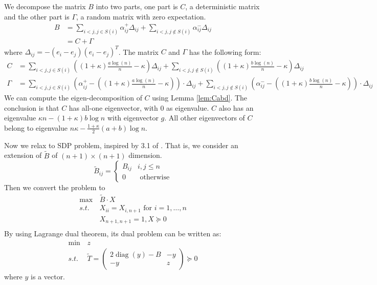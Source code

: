 \documentclass{article}
\DeclareMathOperator{\diag}{diag}
\newcommand{\A}{\frac{a \log(n)}{n}}
\newcommand{\B}{\frac{b \log(n)}{n}}
\begin{document}

We decompose the matrix $B$ into two parts, one part is $C$, a deterministic matrix and the other part is $\Gamma$, a random matrix
with zero expectation.
\begin{align}
B & = \sum_{i<j, j\in S(i)} \alpha_{ij}^+ \Delta_{ij} + \sum_{i<j, j\not\in S(i)}\alpha_{ij}^- \Delta_{ij} \\
& = C + \Gamma
\end{align}
where $\Delta_{ij} = -(e_i - e_j)(e_i - e_j)^T $.
The matrix $C$ and $\Gamma$ has the following form:
\begin{align*}
C &=  \sum_{i<j, j \in S(i)}\left((1+\kappa)\A-\kappa\right)\Delta_{ij}+\sum_{i<j, j \notin S(i)} \left((1+\kappa)\B-\kappa\right) \Delta_{ij}\\
\Gamma &=  \sum_{i<j, j \in S(i)}\left( \alpha^{+}_{ij} - \left((1+\kappa)\A-\kappa\right) \right) \cdot \Delta_{ij} + \sum_{i<j, j \notin S(i)} \left(\alpha^{-}_{ij}-\left((1+\kappa)\B-\kappa\right)\right) \cdot \Delta_{ij}
\end{align*}
We can compute the eigen-decomposition of $C$ using Lemma \ref{lem:Cabd}. The conclusion is that
$C$ has all-one eigenvector, with 0 as eigenvalue. $C$ also has an eigenvalue $\kappa n-(1+\kappa)b\log n$ with eigenvector $g$.
All other eigenvectors of $C$ belong to eigenvalue $n\kappa-\frac{1+\kappa}{2}(a+b)\log n $.

Now we relax to SDP problem, inspired by 3.1 of \cite{rendl2010semidefinite}.
That is, we consider an extension of $\tilde{B}$ of $(n+1)\times (n+1)$ dimension.
\begin{equation}
\tilde{B}_{ij} = \begin{cases}
B_{ij} & i,j\leq n \\
0 & \textrm{ otherwise}
\end{cases}
\end{equation}
Then we convert the problem to
\begin{align*}
\max\,& \tilde{B} \cdot X \\
s.t. & X_{ii} = X_{i,n+1} \textrm{ for } i = 1, \dots, n\\
& X_{n+1, n+1} = 1, X \succeq 0 \\
\end{align*}
By using Lagrange dual theorem, its dual problem can be written as:
\begin{align*}
\min \, & z \\
s.t.\, & \widetilde{T} = \begin{pmatrix}
2\diag(y) - B & -y \\
-y & z 
\end{pmatrix}\succeq 0
\end{align*}
where $y$ is a vector.
\end{document}

